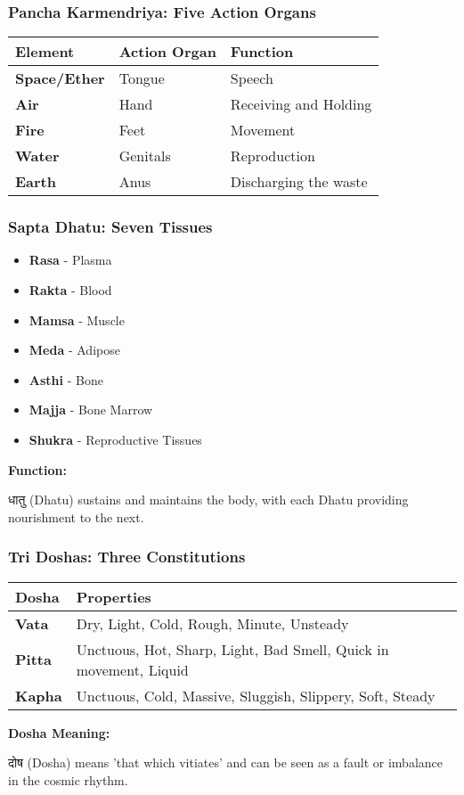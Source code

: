 \begin{frame}[fragile]\frametitle{Pancha Karmendriya: Five Action Organs}
    \begin{tabular}{|l|l|l|}
    \hline
    \textbf{Element} & \textbf{Action Organ} & \textbf{Function} \\
    \hline
    \textbf{Space/Ether} & Tongue & Speech \\
    \hline
    \textbf{Air} & Hand & Receiving and Holding \\
    \hline
    \textbf{Fire} & Feet & Movement \\
    \hline
    \textbf{Water} & Genitals & Reproduction \\
    \hline
    \textbf{Earth} & Anus & Discharging the waste \\
    \hline
    \end{tabular}
\end{frame}

\begin{frame}[fragile]\frametitle{Sapta Dhatu: Seven Tissues}
    \begin{itemize}
        \item \textbf{Rasa} - Plasma
        \item \textbf{Rakta} - Blood
        \item \textbf{Mamsa} - Muscle
        \item \textbf{Meda} - Adipose
        \item \textbf{Asthi} - Bone
        \item \textbf{Majja} - Bone Marrow
        \item \textbf{Shukra} - Reproductive Tissues
    \end{itemize}
    \vspace{0.5cm}
    \textbf{Function:} 
    
    धातु (Dhatu) sustains and maintains the body, with each Dhatu providing nourishment to the next.
    
\end{frame}

\begin{frame}[fragile]\frametitle{Tri Doshas: Three Constitutions}
    \begin{tabular}{|l|l|}
    \hline
    \textbf{Dosha} & \textbf{Properties} \\
    \hline
    \textbf{Vata} & Dry, Light, Cold, Rough, Minute, Unsteady \\
    \hline
    \textbf{Pitta} & Unctuous, Hot, Sharp, Light, Bad Smell, Quick in movement, Liquid \\
    \hline
    \textbf{Kapha} & Unctuous, Cold, Massive, Sluggish, Slippery, Soft, Steady \\
    \hline
    \end{tabular}
    \vspace{0.5cm}
    \textbf{Dosha Meaning:}
    
    दोष (Dosha) means 'that which vitiates' and can be seen as a fault or imbalance in the cosmic rhythm.
    
\end{frame}

